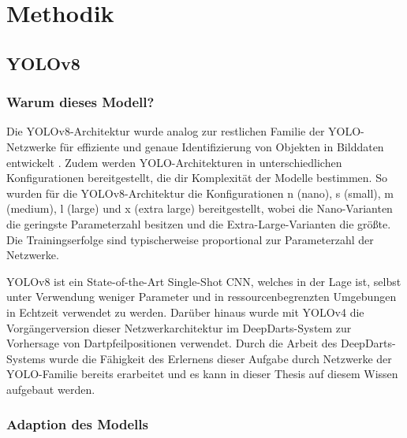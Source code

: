 
\section{Methodik}
\label{sec:ki:methodik}



\subsection{YOLOv8}
\label{sec:warum_yolov8}


\subsubsection{Warum dieses Modell?}

Die YOLOv8-Architektur wurde analog zur restlichen Familie der YOLO-Netzwerke für effiziente und genaue Identifizierung von Objekten in Bilddaten entwickelt \cite{yolov8_paper,adamw_yolo}. Zudem werden YOLO-Architekturen in unterschiedlichen Konfigurationen bereitgestellt, die dir Komplexität der Modelle bestimmen. So wurden für die YOLOv8-Architektur die Konfigurationen n (nano), s (small), m (medium), l (large) und x (extra large) bereitgestellt, wobei die Nano-Varianten die geringste Parameterzahl besitzen und die Extra-Large-Varianten die größte. Die Trainingserfolge sind typischerweise proportional zur Parameterzahl der Netzwerke.


YOLOv8 ist ein State-of-the-Art Single-Shot CNN, welches in der Lage ist, selbst unter Verwendung weniger Parameter und in ressourcenbegrenzten Umgebungen in Echtzeit verwendet zu werden. Darüber hinaus wurde mit YOLOv4 die Vorgängerversion dieser Netzwerkarchitektur im DeepDarts-System zur Vorhersage von Dartpfeilpositionen verwendet. Durch die Arbeit des DeepDarts-Systems wurde die Fähigkeit des Erlernens dieser Aufgabe durch Netzwerke der YOLO-Familie bereits erarbeitet und es kann in dieser Thesis auf diesem Wissen aufgebaut werden.

\subsubsection{Adaption des Modells}
\label{sec:yolo_adaption}

